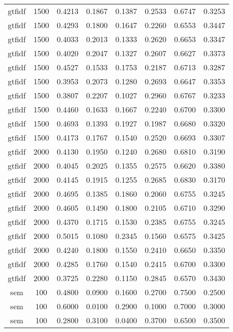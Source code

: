 \begin{scriptsize}
\begin{longtable}{cccccccc}
		gtfidf   & 1500 & 0.4213 & 0.1867 & 0.1387 & 0.2533 & 0.6747 & 0.3253 \\
		gtfidf   & 1500 & 0.4293 & 0.1800 & 0.1647 & 0.2260 & 0.6553 & 0.3447 \\
		gtfidf   & 1500 & 0.4033 & 0.2013 & 0.1333 & 0.2620 & 0.6653 & 0.3347 \\
		gtfidf   & 1500 & 0.4020 & 0.2047 & 0.1327 & 0.2607 & 0.6627 & 0.3373 \\
		gtfidf   & 1500 & 0.4527 & 0.1533 & 0.1753 & 0.2187 & 0.6713 & 0.3287 \\
		gtfidf   & 1500 & 0.3953 & 0.2073 & 0.1280 & 0.2693 & 0.6647 & 0.3353 \\
		gtfidf   & 1500 & 0.3807 & 0.2207 & 0.1027 & 0.2960 & 0.6767 & 0.3233 \\
		gtfidf   & 1500 & 0.4460 & 0.1633 & 0.1667 & 0.2240 & 0.6700 & 0.3300 \\
		gtfidf   & 1500 & 0.4693 & 0.1393 & 0.1927 & 0.1987 & 0.6680 & 0.3320 \\
		gtfidf   & 1500 & 0.4173 & 0.1767 & 0.1540 & 0.2520 & 0.6693 & 0.3307 \\
		gtfidf   & 2000 & 0.4130 & 0.1950 & 0.1240 & 0.2680 & 0.6810 & 0.3190 \\
		gtfidf   & 2000 & 0.4045 & 0.2025 & 0.1355 & 0.2575 & 0.6620 & 0.3380 \\
		gtfidf   & 2000 & 0.4145 & 0.1915 & 0.1255 & 0.2685 & 0.6830 & 0.3170 \\
		gtfidf   & 2000 & 0.4695 & 0.1385 & 0.1860 & 0.2060 & 0.6755 & 0.3245 \\
		gtfidf   & 2000 & 0.4605 & 0.1490 & 0.1800 & 0.2105 & 0.6710 & 0.3290 \\
		gtfidf   & 2000 & 0.4370 & 0.1715 & 0.1530 & 0.2385 & 0.6755 & 0.3245 \\
		gtfidf   & 2000 & 0.5015 & 0.1080 & 0.2345 & 0.1560 & 0.6575 & 0.3425 \\
		gtfidf   & 2000 & 0.4240 & 0.1800 & 0.1550 & 0.2410 & 0.6650 & 0.3350 \\
		gtfidf   & 2000 & 0.4285 & 0.1760 & 0.1540 & 0.2415 & 0.6700 & 0.3300 \\
		gtfidf   & 2000 & 0.3725 & 0.2280 & 0.1150 & 0.2845 & 0.6570 & 0.3430 \\
		sem      & 100  & 0.4800 & 0.0900 & 0.1600 & 0.2700 & 0.7500 & 0.2500 \\
		sem      & 100  & 0.6000 & 0.0100 & 0.2900 & 0.1000 & 0.7000 & 0.3000 \\
		sem      & 100  & 0.2800 & 0.3100 & 0.0400 & 0.3700 & 0.6500 & 0.3500 \\

\end{longtable}
\end{scriptsize}
